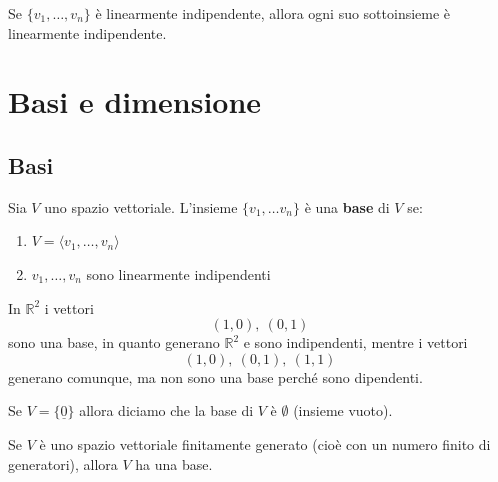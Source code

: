 \documentclass[
  a4paper,
]{article}
\providecommand{\tightlist}{%
  \setlength{\itemsep}{0pt}\setlength{\parskip}{0pt}}
\providecommand{\tightlist}{}
\begin{document}
\begin{observationbox}
Se \(\{v_1, \dots, v_n\}\) è linearmente indipendente, allora ogni suo
sottoinsieme è linearmente indipendente.
\end{observationbox}

\newpage

\hypertarget{basi-e-dimensione}{%
\section{Basi e dimensione}\label{basi-e-dimensione}}

\hypertarget{basi}{%
\subsection{Basi}\label{basi}}

\begin{definitionbox}
Sia \(V\) uno spazio vettoriale. L'insieme \(\{v_1, \dots v_n\}\) è una
\textbf{base} di \(V\) se:

\begin{enumerate}
\def\labelenumi{\arabic{enumi}.}
\tightlist
\item
  \(V = \langle v_1, \dots , v_n\rangle\)
\item
  \(v_1, \dots ,v_n\) sono linearmente indipendenti
\end{enumerate}
\end{definitionbox}

\begin{examplebox}
In \(\mathbb{R}^2\) i vettori \[  
(1,0), \ (0,1)  
\] sono una base, in quanto generano \(\mathbb{R}^2\) e sono
indipendenti, mentre i vettori \[  
(1,0), \ (0,1), \ (1,1)  
\] generano comunque, ma non sono una base perché sono dipendenti.
\end{examplebox}

\begin{notebox}
Se \(V = \{\underline 0\}\) allora diciamo che la base di \(V\) è
\(\emptyset\) (insieme vuoto).
\end{notebox}

\begin{propositionbox}
Se \(V\) è uno spazio vettoriale finitamente generato (cioè con un
numero finito di generatori), allora \(V\) ha una base.
\end{propositionbox}
\end{document}
